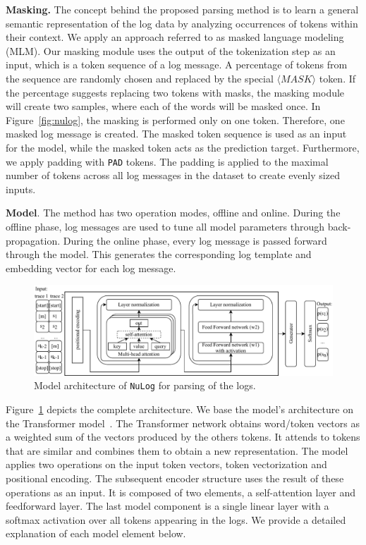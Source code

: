 \textbf{Masking.} The concept behind the proposed parsing method is to learn a general semantic representation of the log data by analyzing occurrences of tokens within their context. We apply an approach referred to as masked language modeling (MLM). Our masking module uses the output of the tokenization step as an input, which is a token sequence of a log message. A percentage of tokens from the sequence are randomly chosen and replaced by the special \texttt{$\langle MASK \rangle$} token. If the percentage suggests replacing two tokens with masks, the masking module will create two samples, where each of the words will be masked once. In Figure~\ref{fig:nulog}, the masking is performed only on one token. Therefore, one masked log message is created. The masked token sequence is used as an input for the model, while the masked token acts as the prediction target. Furthermore, we apply padding with \texttt{PAD} tokens. The padding is applied to the maximal number of tokens across all log messages in the dataset to create evenly sized inputs.

\textbf{Model}. The method has two operation modes, offline and online. During the offline phase, log messages are used to tune all model parameters through back-propagation. During the online phase, every log message is passed forward through the model. This generates the corresponding log template and embedding vector for each log message.


\begin{figure}[!t]
\centerline{\includegraphics[width=\textwidth]{gfx/chap5/nulogtransformer.pdf}}
\caption{Model architecture of \texttt{NuLog} for parsing of the logs.}
\label{fig:2}
\end{figure}

Figure~\ref{fig:2} depicts the complete architecture. We base the model's architecture on the Transformer model~\cite{vaswani2017attention}. The Transformer network obtains word/token vectors as a weighted sum of the vectors produced by the others tokens. It attends to tokens that are similar and combines them to obtain a new representation. The model applies two operations on the input token vectors, token vectorization and positional encoding. The subsequent encoder structure uses the result of these operations as an input. It is composed of two elements, a self-attention layer and feedforward layer. The last model component is a single linear layer with a softmax activation over all tokens appearing in the logs. We provide a detailed explanation of each model element below.

